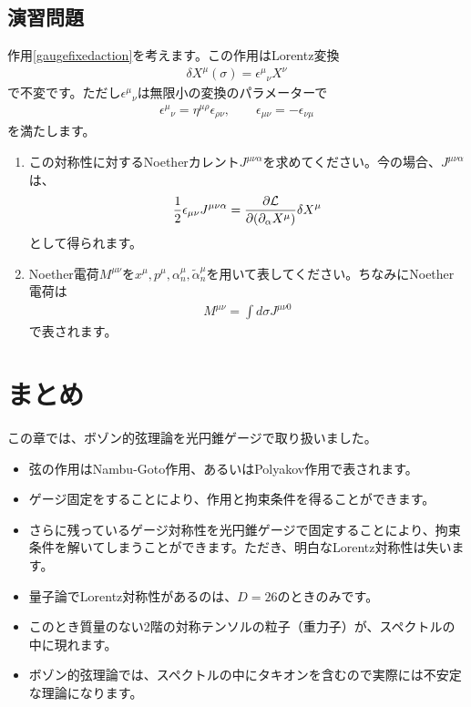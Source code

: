 \documentclass[report,paper=a4, fontsize=12pt, line_length=16cm, number_of_lines=33,dvipdfmx]{jlreq}
\numberwithin{equation}{chapter}
\numberwithin{equation}{section}
\newcommand{\del}{\partial}
\newcommand{\alphat}{\tilde{\alpha}}
\newcommand{\Lcal}{\mathcal{L}}
\begin{document}
\subsection*{演習問題}
作用\eqref{gaugefixedaction}を考えます。この作用はLorentz変換
\begin{align}
  \delta X^{\mu}(\sigma)=\epsilon^{\mu}{}_{\nu}X^{\nu}
\end{align}
で不変です。ただし$\epsilon^{\mu}{}_{\nu}$は無限小の変換のパラメーターで
\begin{align}
  \epsilon^{\mu}{}_{\nu}=\eta^{\mu\rho}\epsilon_{\rho\nu},\qquad \epsilon_{\mu\nu}=-\epsilon_{\nu\mu}
\end{align}
を満たします。
\begin{enumerate}
\item この対称性に対するNoetherカレント$J^{\mu\nu\alpha}$を求めてください。今の場合、$J^{\mu\nu\alpha}$は、
\begin{align}
  \frac12 \epsilon_{\mu\nu}J^{\mu\nu\alpha}=\pdv{\Lcal}{(\del_{\alpha}X^{\mu})}\delta X^{\mu}
\end{align}
として得られます。
\item Noether電荷$M^{\mu\nu}$を$x^{\mu},p^{\mu},\alpha^{\mu}_{n},\alphat^{\mu}_{n}$を用いて表してください。ちなみにNoether電荷は
\begin{align}
  M^{\mu\nu}=\int d\sigma J^{\mu\nu 0}
\end{align}
で表されます。
\end{enumerate}


\section{まとめ}
この章では、ボゾン的弦理論を光円錐ゲージで取り扱いました。
\begin{itemize}
  \item 弦の作用はNambu-Goto作用、あるいはPolyakov作用で表されます。
  \item ゲージ固定をすることにより、作用と拘束条件を得ることができます。
  \item さらに残っているゲージ対称性を光円錐ゲージで固定することにより、拘束条件を解いてしまうことができます。ただき、明白なLorentz対称性は失います。
  \item 量子論でLorentz対称性があるのは、$D=26$のときのみです。
  \item このとき質量のない2階の対称テンソルの粒子（重力子）が、スペクトルの中に現れます。
  \item ボゾン的弦理論では、スペクトルの中にタキオンを含むので実際には不安定な理論になります。
\end{itemize}
\end{document}
